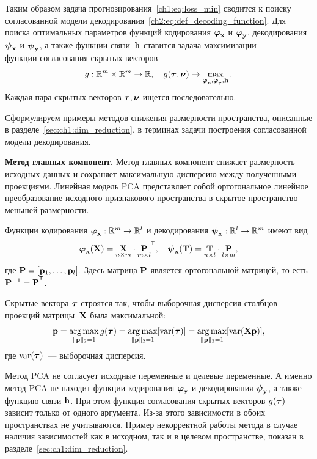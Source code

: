 Таким образом задача прогнозирования~\eqref{ch1:eq:loss_min} сводится к поиску согласованной модели декодирования~\eqref{ch2:eq:def_decoding_function}. 
Для поиска оптимальных параметров функций кодирования $\boldsymbol{\varphi}_{\mathbf{x}}$ и $\boldsymbol{\varphi}_{\mathbf{y}}$, декодирования $\boldsymbol{\psi}_{\mathbf{x}}$ и $\boldsymbol{\psi}_{\mathbf{y}}$, а также функции связи~$\mathbf{h}$ ставится задача максимизации $\textit{функции согласования скрытых векторов}$
\[
	g: \mathbb{R}^m \times \mathbb{R}^m \rightarrow \mathbb{R}, \quad g(\boldsymbol{\tau}, \boldsymbol{\nu}) \rightarrow \max_{\boldsymbol{\varphi}_{\mathbf{x}}, \boldsymbol{\varphi}_{\mathbf{y}}, \mathbf{h}}.
\]
Каждая пара скрытых векторов $\boldsymbol{\tau}, \boldsymbol{\nu}$ ищется последовательно.

Сформулируем примеры методов снижения размерности пространства, описанные в разделе~\ref{sec:ch1:dim_reduction}, в терминах задачи построения согласованной модели декодирования.

\textbf{Метод главных компонент.} 
Метод главных компонент снижает размерность исходных данных и сохраняет максимальную дисперсию между полученными проекциями. 
Линейная модель PCA представляет собой ортогональное линейное преобразование исходного признакового пространства в скрытое пространство меньшей размерности. 

Функции кодирования $\boldsymbol{\varphi}_{\mathbf{x}}: \mathbb{R}^m \to \mathbb{R}^l$ и декодирования $\boldsymbol{\psi}_{\mathbf{x}}: \mathbb{R}^l \to \mathbb{R}^m$ имеют вид
\begin{equation*}
	\bphi_{\bx}(\bX) =  \underset{n \times m}\bX \cdot \underset{m \times l}\bP^{\T}, \quad	\bpsi_{\bx}(\bT) =  \underset{n \times l}\bT \cdot \underset{l \times m}\bP,
	\label{ch2:eq:PCA2}
\end{equation*}
где $\mathbf{P} = [\mathbf{p}_1, \dots, \mathbf{p}_l].$ 
Здесь матрица $\mathbf{P}$ является ортогональной матрицей, то есть $\bP^{-1} = \bP^{\T}$.

Скрытые вектора $\boldsymbol{\tau}$ строятся так, чтобы выборочная дисперсия столбцов проекций матрицы~$\mathbf{X}$ была максимальной:
\begin{equation*}
	\mathbf{p} = \mathop{\arg \max}\limits_{\|\mathbf{p}\|_{2} = 1} g(\boldsymbol{\tau}) = \mathop{\arg \max}\limits_{\|\mathbf{p}\|_{2} = 1} [\text{var}(\boldsymbol{\tau})] = \mathop{\arg \max}\limits_{\|\mathbf{p}\|_{2} = 1} [\text{var}(\mathbf{X} \textbf{p})],
\end{equation*}
где $\text{var}(\boldsymbol{\tau})$~--- выборочная дисперсия.

Метод PCA не согласует исходные переменные и целевые переменные. 
А именно метод PCA не находит функции кодирования $\boldsymbol{\varphi}_{\mathbf{y}}$ и декодирования $\boldsymbol{\psi}_{\mathbf{y}}$, а также функцию связи $\mathbf{h}$. 
При этом функция согласования скрытых векторов $g(\boldsymbol{\tau})$ зависит только от одного аргумента.
Из-за этого зависимости в обоих пространствах не учитываются.
Пример некорректной работы  метода в случае наличия зависимостей как в исходном, так и в целевом пространстве, показан в разделе~\ref{sec:ch1:dim_reduction}.


